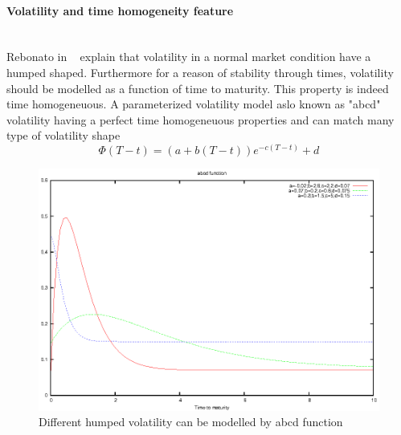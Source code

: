 \documentclass[a4paper,10pt]{article}
\begin{document}
\paragraph{Volatility and time homogeneity feature}\mbox{} \\
Rebonato in ~\cite{REBONATO2002} explain that volatility in a normal market condition have a humped shaped. Furthermore for a reason of stability through times, volatility should be modelled as a function of time to maturity. This property is indeed time homogeneuous. A parameterized volatility model aslo known as "abcd" volatility having a perfect time homogeneuous properties and can match many type of volatility shape
\begin{equation}
\Phi(T-t) = (a + b(T-t)) e^{-c(T-t)} + d
\label{eq:abcd}
\end{equation}

\begin {figure}[h]
\begin{center}
\includegraphics[scale=1.0]{gnuplot_abcdFunction}
\end{center}
\caption{\label{fig:abcd_curve} Different humped volatility can be modelled by  abcd function}
\end {figure}
\end{document}
